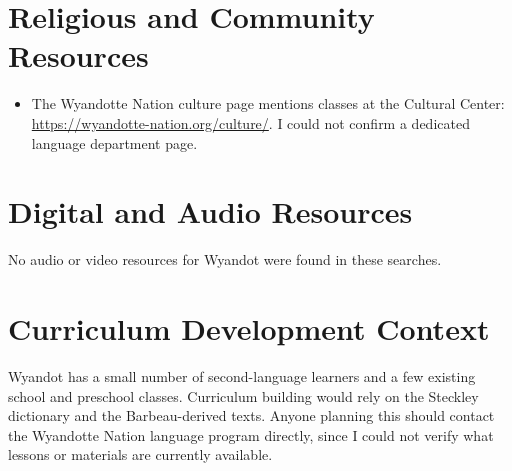\documentclass[12pt]{article}
\begin{document}
\section{Religious and Community Resources}
\begin{itemize}
\item The Wyandotte Nation culture page mentions classes at the Cultural Center: \url{https://wyandotte-nation.org/culture/}. I could not confirm a dedicated language department page.
\end{itemize}

\section{Digital and Audio Resources}
No audio or video resources for Wyandot were found in these searches.

\section{Curriculum Development Context}
Wyandot has a small number of second-language learners and a few existing school and preschool classes. Curriculum building would rely on the Steckley dictionary and the Barbeau-derived texts. Anyone planning this should contact the Wyandotte Nation language program directly, since I could not verify what lessons or materials are currently available.
\end{document}
